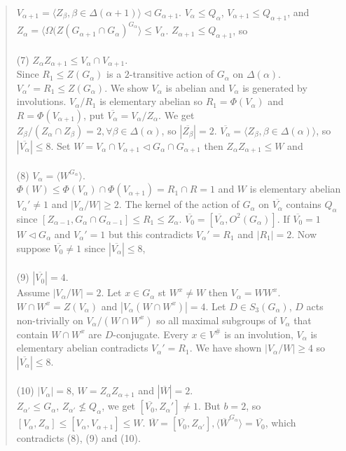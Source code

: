 \begin{quote}
$V_{\alpha + 1} = \langle Z_{\beta}, \beta \in \Delta(\alpha + 1) \rangle \lhd G_{\alpha + 1}$.
$V_{\alpha} \leq Q_{\alpha}$,
$V_{\alpha + 1} \leq Q_{\alpha + 1}$, and
$Z_{\alpha} = \langle \Omega(Z(G_{\alpha + 1} \cap G_{\alpha})^{G_{\alpha}} \rangle \leq V_{\alpha}$.
$Z_{\alpha + 1} \leq Q_{\alpha + 1}$, so \\
\\
(7) $Z_{\alpha} Z_{\alpha + 1} \leq V_{\alpha} \cap V_{\alpha + 1}$.\\
Since $R_1 \leq Z(G_{\alpha})$ is a $2$-transitive action of $G_{\alpha}$ on $\Delta(\alpha )$.
${V_{\alpha}}' = R_1 \leq Z(G_{\alpha})$.
We show $V_{\alpha}$ is abelian and $V_{\alpha}$ is generated by involutions.
$V_{\alpha} / R_1$ is elementary abelian so $R_1 = \Phi(V_{\alpha})$ and $R = \Phi(V_{\alpha + 1})$, put
${\overline {V_{\alpha}}} = V_{\alpha} / Z_{\alpha}$.  We get $Z_{\beta}/(Z_{\alpha} \cap Z_{\beta})= 2, \forall \beta \in \Delta(\alpha)$,
so $|{\overline {Z_{\beta}}}| = 2$.  ${\overline {V_{\alpha}}} = \langle Z_{\beta}, \beta \in \Delta(\alpha)\rangle$, so $|{\overline {V_{\alpha}}}| \leq 8$.  Set $W= V_{\alpha} \cap V_{\alpha + 1} \lhd G_{\alpha} \cap G_{\alpha + 1}$ then
$Z_{\alpha}Z_{\alpha + 1} \leq W$ and\\
\\
(8)  $V_{\alpha} = \langle W^{G_{\alpha}} \rangle$.\\
$\Phi(W) \leq \Phi(V_{\alpha}) \cap \Phi(V_{\alpha + 1}) =R_1 \cap R =1$ and $W$ is elementary abelian
${V_{\alpha}}' \ne 1$ and $|V_{\alpha} / W| \geq 2$.
The kernel of the action of $G_{\alpha}$ on ${\overline {V_{\alpha}}}$ contains $Q_{\alpha}$ since
$[Z_{\alpha - 1} , G_{\alpha} \cap G_{\alpha - 1}] \leq R_1 \leq Z_{\alpha}$.
${\overline {V_0}} = [{\overline {V_{\alpha}}}, O^2(G_{\alpha})]$.
If ${\overline {V_0}} = 1$ $W \lhd G_{\alpha}$ and ${V_{\alpha}}' =1$ but this contradicts ${V_{\alpha}}' = R_1$ and
$|R_1| = 2$.
Now suppose ${\overline {V_0}} \ne 1$ since $|{\overline {V_{\alpha}}}| \leq 8$, \\
\\
(9) $|{\overline {V_0}}| = 4$.\\
Assume $|V_{\alpha} / W| = 2$.  Let $x \in G_{\alpha}$ st $W^x \ne W$
then $V_{\alpha} = W W^x$.
$W  \cap W^x = Z(V_{\alpha})$ and $|V_{\alpha} (W \cap W^x)| = 4$.  Let $D \in S_3(G_{\alpha})$, $D$ acts non-trivially on
$V_{\alpha} / (W \cap W^x)$ so all maximal subgroups of $V_{\alpha}$ that contain $W \cap W^x$ are $D$-conjugate.
Every $x \in V^{\#}$ is an involution, $V_{\alpha}$ is elementary abelian contradicts ${V_{\alpha}}' = R_1$.
We have shown $|V_{\alpha}/ W| \geq 4$ so  $|{\overline {V_{\alpha}}}| \leq 8$. \\
\\
(10) $|V_{\alpha}|=8$, $W = Z_{\alpha}Z_{\alpha + 1}$ and $|{\overline W}|=2$.\\
$Z_{\alpha'} \leq G_{\alpha}$, $Z_{\alpha'} \nleq Q_{\alpha}$,
we get $[{\overline {V_0}}, Z_{\alpha}'] \ne 1$.  But $b = 2$,
so $[V_{\alpha}, Z_{\alpha}] \leq [V_{\alpha}, V_{\alpha + 1}] \leq W$.
${\overline W} = [{\overline {V_0}}, Z_{\alpha'}], \langle {\overline W}^{G_{\alpha}} \rangle = {\overline {V_0}}$, which
contradicts (8), (9) and (10).
\end{quote}
